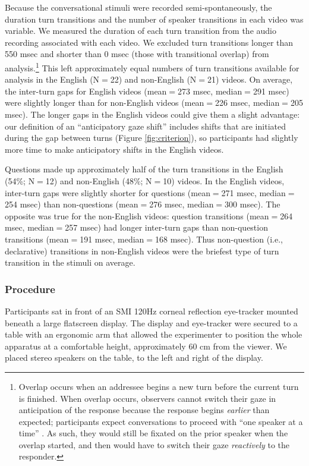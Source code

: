\documentclass[authoryear, 12pt]{elsarticle}
\begin{document}
Because the conversational stimuli were recorded semi-spontaneously, the duration turn transitions and the number of speaker transitions in each video was variable. We measured the duration of each turn transition from the audio recording associated with each video. We excluded turn transitions longer than 550 msec and shorter than 0 msec (those with transitional overlap) from analysis.\footnote{Overlap occurs when an addressee begins a new turn before the current turn is finished. When overlap occurs, observers cannot switch their gaze in anticipation of the response because the response begins \textit{earlier} than expected; participants expect conversations to proceed with ``one speaker at a time'' \citep{sacks1974}. As such, they would still be fixated on the prior speaker when the overlap started, and then would have to switch their gaze \textit{reactively} to the responder.} This left approximately equal numbers of turn transitions available for analysis in the English (N$=$22) and non-English (N$=$21) videos. On average, the inter-turn gaps for English videos (mean$=$273 msec, median$=$291 msec) were slightly longer than for non-English videos (mean$=$226 msec, median$=$205 msec). The longer gaps in the English videos could give them a slight advantage: our definition of an ``anticipatory gaze shift'' includes shifts that are initiated during the gap between turns (Figure \ref{fig:criterion}), so participants had slightly more time to make anticipatory shifts in the English videos.

Questions made up approximately half of the turn transitions in the English (54\%; N$=$12) and non-English (48\%; N$=$10) videos. In the English videos, inter-turn gaps were slightly shorter for questions (mean$=$271 msec, median$=$254 msec) than non-questions (mean$=$276 msec, median$=$300 msec). The opposite was true for the non-English videos: question transitions (mean$=$264 msec, median$=$257 msec) had longer inter-turn gaps than non-question transitions (mean$=$191 msec, median$=$168 msec). Thus non-question (i.e., declarative) transitions in non-English videos were the briefest type of turn transition in the stimuli on average.

\subsubsection{Procedure} 
Participants sat in front of an SMI 120Hz corneal reflection eye-tracker mounted beneath a large flatscreen display. The display and eye-tracker were secured to a table with an ergonomic arm that allowed the experimenter to position the whole apparatus at a comfortable height, approximately 60 cm from the viewer. We placed stereo speakers on the table, to the left and right of the display. 
\end{document}
